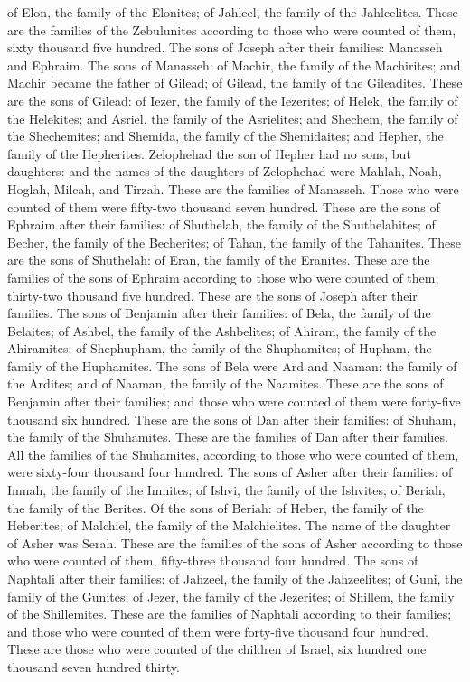 of Elon, the family of the Elonites; of Jahleel, the family of the Jahleelites.
\myverse{}These are the families of the Zebulunites according to those who were counted
of them, sixty thousand five hundred.
\myverse{}The sons of Joseph after their families: Manasseh and Ephraim.
\myverse{}The sons of Manasseh: of Machir, the family of the Machirites; and Machir
became the father of Gilead; of Gilead, the family of the Gileadites.
\myverse{}These are the sons of Gilead: of Iezer, the family of the Iezerites; of Helek,
the family of the Helekites;
\myverse{}and Asriel, the family of the Asrielites; and Shechem, the family of the
Shechemites;
\myverse{}and Shemida, the family of the Shemidaites; and Hepher, the family of the
Hepherites.
\myverse{}Zelophehad the son of Hepher had no sons, but daughters: and the names of
the daughters of Zelophehad were Mahlah, Noah, Hoglah, Milcah, and Tirzah.
\myverse{}These are the families of Manasseh. Those who were counted of them were fifty-two
thousand seven hundred.
\myverse{}These are the sons of Ephraim after their families: of Shuthelah, the family
of the Shuthelahites; of Becher, the family of the Becherites; of Tahan, the family of the Tahanites.
\myverse{}These are the sons of Shuthelah: of Eran, the family of the Eranites.
\myverse{}These are the families of the sons of Ephraim according to those who were
counted of them, thirty-two thousand five hundred. These are the sons of Joseph after their families.
\myverse{}The sons of Benjamin after their families: of Bela, the family of the Belaites;
of Ashbel, the family of the Ashbelites; of Ahiram, the family of the Ahiramites;
\myverse{}of Shephupham, the family of the Shuphamites; of Hupham, the family of the
Huphamites.
\myverse{}The sons of Bela were Ard and Naaman: the family of the Ardites; and of Naaman,
the family of the Naamites.
\myverse{}These are the sons of Benjamin after their families; and those who were counted
of them were forty-five thousand six hundred.
\myverse{}These are the sons of Dan after their families: of Shuham, the family of
the Shuhamites. These are the families of Dan after their families.
\myverse{}All the families of the Shuhamites, according to those who were counted of
them, were sixty-four thousand four hundred.
\myverse{}The sons of Asher after their families: of Imnah, the family of the Imnites;
of Ishvi, the family of the Ishvites; of Beriah, the family of the Berites.
\myverse{}Of the sons of Beriah: of Heber, the family of the Heberites; of Malchiel,
the family of the Malchielites.
\myverse{}The name of the daughter of Asher was Serah.
\myverse{}These are the families of the sons of Asher according to those who were counted
of them, fifty-three thousand four hundred.
\myverse{}The sons of Naphtali after their families: of Jahzeel, the family of the
Jahzeelites; of Guni, the family of the Gunites;
\myverse{}of Jezer, the family of the Jezerites; of Shillem, the family of the Shillemites.
\myverse{}These are the families of Naphtali according to their families; and those
who were counted of them were forty-five thousand four hundred.
\myverse{}These are those who were counted of the children of Israel, six hundred one
thousand seven hundred thirty.


